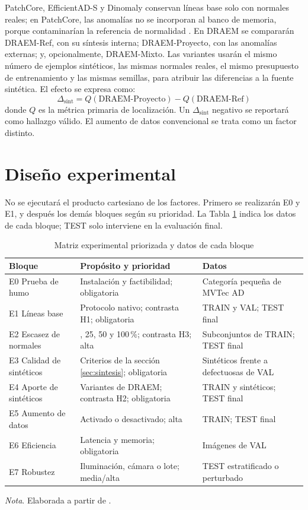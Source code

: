\documentclass[12pt,oneside]{report}
\newcommand{\nota}[1]{\par\noindent\textit{Nota}. #1\par}
\begin{document}
PatchCore, EfficientAD-S y Dinomaly conservan líneas base solo con normales reales; en PatchCore, las anomalías no se incorporan al banco de memoria, porque contaminarían la referencia de normalidad \cite{paez2026}. En DRAEM se compararán DRAEM-Ref, con su síntesis interna; DRAEM-Proyecto, con las anomalías externas; y, opcionalmente, DRAEM-Mixto. Las variantes usarán el mismo número de ejemplos sintéticos, las mismas normales reales, el mismo presupuesto de entrenamiento y las mismas semillas, para atribuir las diferencias a la fuente sintética. El efecto se expresa como:
\begin{equation}
  \Delta_{\mathrm{sint}} = Q(\text{DRAEM-Proyecto}) - Q(\text{DRAEM-Ref})
\end{equation}
donde $Q$ es la métrica primaria de localización. Un $\Delta_{\mathrm{sint}}$ negativo se reportará como hallazgo válido. El aumento de datos convencional \cite{shorten2019} se trata como un factor distinto.

\section{Diseño experimental}

No se ejecutará el producto cartesiano de los factores. Primero se realizarán E0 y E1, y después los demás bloques según su prioridad. La Tabla \ref{tab:experimentos} indica los datos de cada bloque; TEST solo interviene en la evaluación final.

\begin{table}[H]
\singlespacing\setlength{\parindent}{0pt}\setlength{\RaggedRightParindent}{0pt}
\caption{Matriz experimental priorizada y datos de cada bloque}
\label{tab:experimentos}
\begin{tabularx}{\textwidth}{@{}>{\RaggedRight\arraybackslash}p{3.2cm}>{\RaggedRight\arraybackslash}X>{\RaggedRight\arraybackslash}p{5.2cm}@{}}
\toprule
Bloque & Propósito y prioridad & Datos \\
\midrule
E0 Prueba de humo & Instalación y factibilidad; obligatoria & Categoría pequeña de MVTec AD \\
E1 Líneas base & Protocolo nativo; contrasta H1; obligatoria & TRAIN y VAL; TEST final \\
E2 Escasez de normales & 10, 25, 50 y 100\,\%; contrasta H3; alta & Subconjuntos de TRAIN; TEST final \\
E3 Calidad de sintéticos & Criterios de la sección \ref{sec:sintesis}; obligatoria & Sintéticos frente a defectuosas de VAL \\
E4 Aporte de sintéticos & Variantes de DRAEM; contrasta H2; obligatoria & TRAIN y sintéticos; TEST final \\
E5 Aumento de datos & Activado o desactivado; alta & TRAIN; TEST final \\
E6 Eficiencia & Latencia y memoria; obligatoria & Imágenes de VAL \\
E7 Robustez & Iluminación, cámara o lote; media/alta & TEST estratificado o perturbado \\
\bottomrule
\end{tabularx}
\nota{Elaborada a partir de \cite{paez2026}.}
\end{table}
\end{document}
